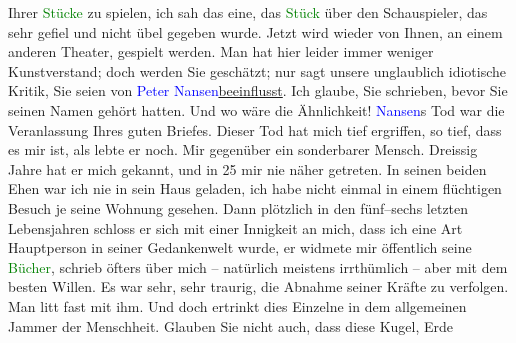                     Ihrer \textcolor{green}{Stücke}{} zu
                    spielen, ich sah das eine, das \textcolor{green}{Stück}{} über den Schauspieler, das sehr gefiel und nicht übel gegeben
                    wurde. Jetzt wird wieder \label{K_L02303_2v}\label{K_L02303_2h} von Ihnen, an einem anderen
                    Theater, gespielt werden. Man hat hier leider immer weniger Kunstverstand; doch
                    werden Sie geschätzt; nur sagt unsere unglaublich idiotische Kritik, Sie seien
                    von \textcolor{blue}{Peter Nansen}{}\ledrightnote{\textcolor{blue}{Peter Nansen}}{ }\uline{beeinflusst}. Ich glaube, Sie schrieben, bevor
                    Sie seinen Namen gehört hatten. Und wo wäre die Ähnlichkeit!\pend
           \pstart
           \textcolor{blue}{Nansen}{}\ledrightnote{\textcolor{blue}{Peter Nansen}}s Tod war die Veranlassung Ihres guten
                    Briefes. Dieser Tod hat mich tief ergriffen, so tief, dass es mir ist, als lebte
                    er noch. Mir gegenüber ein sonderbarer Mensch. Dreissig Jahre hat er mich
                    gekannt, und \introOben{}in 25\introOben{} mir nie näher getreten. In seinen
                    beiden Ehen war ich nie in sein Haus geladen, ich habe nicht einmal in einem
                    flüchtigen Besuch je seine Wohnung {\pb}gesehen. Dann plötzlich in
                    den fünf–sechs letzten Lebensjahren schloss er sich mit einer Innigkeit an mich,
                    dass ich eine Art Hauptperson in seiner Gedankenwelt wurde, er widmete mir
                    öffentlich seine \textcolor{green}{Bücher}{},
                    schrieb öfters über mich – natürlich meistens irrthümlich – aber mit dem besten
                    Willen.\pend
           \pstart
           Es war sehr, sehr traurig, die Abnahme seiner Kräfte zu verfolgen. Man litt fast
                    mit ihm.\pend
           \pstart
           Und doch ertrinkt dies Einzelne in dem allgemeinen Jammer der Menschheit. Glauben
                    Sie nicht  auch, dass diese Kugel, Erde
